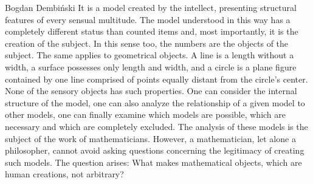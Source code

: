 \begin{artengenv}{Bogdan Dembiński}
It is a model created by the intellect, presenting structural features of every sensual multitude. The model understood
in this way has a completely different status than counted items and, most importantly, it is the creation of the
subject. In this sense too, the numbers are the objects of the subject. The same applies to geometrical objects. A line
is a length without a width, a surface possesses only length and width, and a circle is a plane figure contained by one
line comprised of points equally distant from the circle’s center. None of the sensory objects has such properties. One
can consider the internal structure of the model, one can also analyze the relationship of a given model to other
models, one can finally examine which models are possible, which are necessary and which are completely excluded. The
analysis of these models is the subject of the work of mathematicians. However, a mathematician, let alone a
philosopher, cannot avoid asking questions concerning the legitimacy of creating such models. The question arises: What
makes mathematical objects, which are human creations, not arbitrary?


\end{artengenv}
